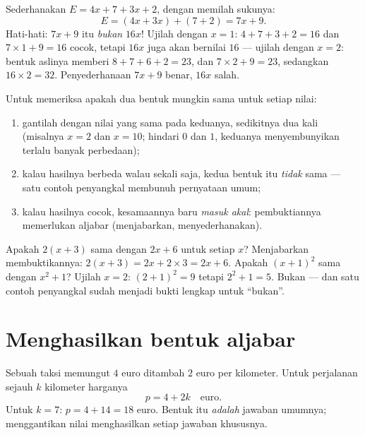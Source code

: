 \begin{example}\label{ex:g7:literal:reduce}
Sederhanakan $E = 4x + 7 + 3x + 2$, dengan memilah sukunya:
\[
E = (4x + 3x) + (7 + 2) = 7x + 9 .
\]
Hati-hati: $7x + 9$ itu \emph{bukan} $16x$! Ujilah dengan $x = 1$:
$4 + 7 + 3 + 2 = 16$ dan $7 \times 1 + 9 = 16$ cocok, tetapi $16x$
juga akan bernilai $16$ --- ujilah dengan $x = 2$: bentuk aslinya
memberi $8 + 7 + 6 + 2 = 23$, dan $7 \times 2 + 9 = 23$, sedangkan
$16 \times 2 = 32$. Penyederhanaan $7x + 9$ benar, $16x$ salah.
\end{example}

\begin{method}\label{met:g7:literal:test}
Untuk memeriksa apakah dua bentuk mungkin sama untuk setiap nilai:
\begin{enumerate}
  \item gantilah dengan nilai yang sama pada keduanya, sedikitnya dua
        kali (misalnya $x = 2$ dan $x = 10$; hindari $0$ dan $1$,
        keduanya menyembunyikan terlalu banyak perbedaan);
  \item kalau hasilnya berbeda walau sekali saja, kedua bentuk itu
        \emph{tidak} sama --- satu contoh penyangkal membunuh
        pernyataan umum;
  \item kalau hasilnya cocok, kesamaannya baru \emph{masuk akal}:
        pembuktiannya memerlukan aljabar (menjabarkan, menyederhanakan).
\end{enumerate}
\end{method}

\begin{example}\label{ex:g7:literal:test}
Apakah $2(x + 3)$ sama dengan $2x + 6$ untuk setiap $x$? Menjabarkan
membuktikannya: $2(x+3) = 2x + 2 \times 3 = 2x + 6$. Apakah
$(x + 1)^2$ sama dengan $x^2 + 1$? Ujilah $x = 2$: $(2+1)^2 = 9$
tetapi $2^2 + 1 = 5$. Bukan --- dan satu contoh penyangkal sudah
menjadi bukti lengkap untuk ``bukan''.
\end{example}

\section{Menghasilkan bentuk aljabar}

\begin{example}\label{ex:g7:literal:produce}
Sebuah taksi memungut $4$ euro ditambah $2$ euro per kilometer. Untuk
perjalanan sejauh $k$ kilometer harganya
\[
p = 4 + 2k \quad\text{euro}.
\]
Untuk $k = 7$: $p = 4 + 14 = 18$ euro. Bentuk itu \emph{adalah} jawaban umumnya;
menggantikan nilai menghasilkan setiap jawaban khususnya.
\end{example}

